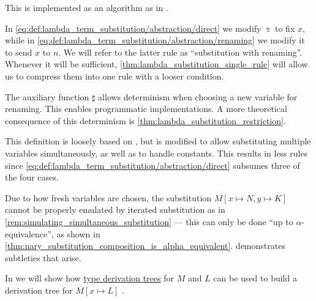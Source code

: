 \begin{comments}
  \item This is implemented as an algorithm as  in \cite{notebook:code}.

  \item In \eqref{eq:def:lambda_term_substitution/abstraction/direct} we modify \( \Bbbs \) to fix \( x \), while in \eqref{eq:def:lambda_term_substitution/abstraction/renaming} we modify it to send \( x \) to \( n \). We will refer to the latter rule as \enquote{substitution with renaming}. Whenever it will be sufficient, \cref{thm:lambda_substitution_single_rule} will allow us to compress them into one rule with a looser condition.

  \item The auxiliary function \( \sharp \) allows determinism when choosing a new variable for renaming. This enables programmatic implementations. A more theoretical consequence of this determinism is \cref{thm:lambda_substitution_restriction}.

  \item This definition is loosely based on \cite[def. 1A7]{Hindley1997BasicSTT}, but is modified to allow substituting multiple variables simultaneously, as well as to handle constants. This results in less rules since \eqref{eq:def:lambda_term_substitution/abstraction/direct} subsumes three of the four cases.

  \item Due to how fresh variables are chosen, the substitution \( M[x \mapsto N, y \mapsto K] \) cannot be properly emulated by iterated substitution as in \cref{rem:simulating_simultaneous_substitution} --- this can only be done \enquote{up to \( \alpha \)-equivalence}, as shown in \cref{thm:nary_substitution_composition_is_alpha_equivalent}.  demonstrates subtleties that arise.

  \item In  we will show how \hyperref[def:type_derivation_tree]{type derivation trees} for \( M \) and \( L \) can be used to build a derivation tree for \( M[x \mapsto L] \) .
\end{comments}

